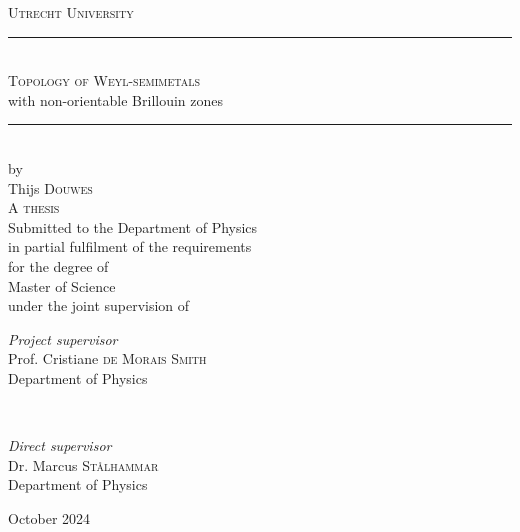 \documentclass[11pt,a4paper]{report}
\theoremstyle{definition}
\theoremstyle{remark}
\newcommand{\?}{\stackrel{?}{=}}
\begin{document}
	
\begin{titlepage}  %
	\center
	
	\textsc{\LARGE Utrecht University}\\[1.5cm]  %
	
	
	\rule{\linewidth}{0.5mm}\\[0.4cm]
	
	{\Huge\textsc{Topology of Weyl-semimetals}\\[.2cm] \huge  with non-orientable Brillouin zones}\\[0.4cm] %
	
	\rule{\linewidth}{0.5mm}\\[.8cm]
	
	
	{\large by}\\[.8cm]
	
	
	{\LARGE Thijs \textsc{Douwes}}\\[1.1cm]
	
	
	
	{\Large \textsc{A thesis}}\\[.8cm]
	
	
	{\large Submitted to the Department of Physics}\\[.1cm]
	{\large in partial fulfilment of the requirements}\\[.1cm]
	{\large for the degree of}\\[.5cm]
	
	{\Large Master of Science}\\[.9cm]
	
	
	{\large under the joint supervision of}\\[1cm]
	
	
	\begin{minipage}{0.45\textwidth}
		\begin{flushleft}
			\large
			\textit{Project supervisor}\\
			Prof. Cristiane \textsc{de Morais Smith}\\
			\normalsize Department of Physics
		\end{flushleft}
	\end{minipage}
	~
	\begin{minipage}{0.45\textwidth}
		\begin{flushright}
			\large
			\textit{Direct supervisor}\\
			Dr. Marcus \textsc{St{\aa}lhammar}\\
			\normalsize Department of Physics
		\end{flushright}
	\end{minipage}
	
	
	\vfill\vfill\vfill  %
	
	{\large October 2024}  %
	
	\vfill  %
\end{titlepage}
\setcounter{page}{2}  %
	
\end{document}
